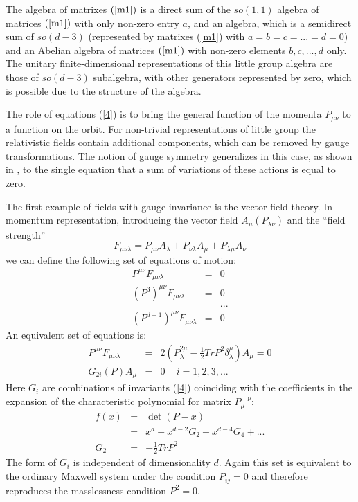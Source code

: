 \documentclass[a4paper,12pt]{article}
\begin{document}
The algebra of matrixes $(\ref{m1})$ is a direct sum of the
$so(1,1)$ algebra of matrices $(\ref{m1})$ with only non-zero
entry $a$, and an algebra, which is a semidirect sum of $so(d-3)$
(represented by matrixes (\ref {m1}) with $a=b=c=...=d=0$) and an
Abelian algebra of matrices $(\ref{m1})$ with non-zero elements
$b,c,...,d$ only. The unitary finite-dimensional representations
of this little group algebra are those of $so(d-3)$ subalgebra,
with other generators represented by zero, which is possible due
to the structure of the algebra.

The role of equations (\ref{4}) is to bring the general function
of the momenta $ P_{\mu \nu }$ to a function on the orbit. For
non-trivial representations of little group the relativistic
fields contain additional components, which can be removed by
gauge transformations. The notion of gauge symmetry generalizes in
this case, as shown in \cite{Man1}, to the single equation that a
sum of variations of these actions is equal to zero.

The first example of fields with gauge invariance is the vector
field theory. In momentum representation, introducing the vector
field $A_{\mu }(P_{\lambda \nu })$ and the ``field strength''
\begin{equation}
F_{\mu \nu \lambda }=P_{\mu \nu }A_{\lambda }+P_{\nu \lambda
}A_{\mu }+P_{\lambda \mu }A_{\nu }  \label{14}
\end{equation}
we can define the following set of equations of motion:
\begin{eqnarray}
P^{\mu \nu }F_{\mu \nu \lambda } &=&0  \label{15-0.1} \\
(P^{3})^{\mu \nu }F_{\mu \nu \lambda } &=&0  \label{15-0.2} \\
&&... \\
(P^{d-1})^{\mu \nu }F_{\mu \nu \lambda } &=&0  \label{15-0.4}
\end{eqnarray}
An equivalent set of equations is:
\begin{eqnarray}
P^{\mu \nu }F_{\mu \nu \lambda } &=&2\left( P_{\lambda }^{2\mu
}-\frac{1}{2}
TrP^{2}\delta _{\lambda }^{\mu }\right) A_{\mu }=0  \label{15.1} \\
G_{2i}(P)A_{\mu } &=&0\,\,\,\,\,\,\,i=1,2,3,...  \label{15.2}
\end{eqnarray}
Here $G_{i}$  are combinations of invariants (\ref{4}) coinciding
with the coefficients in the expansion of the characteristic
polynomial for matrix $P_{\mu }^{\quad \nu }$:
\begin{eqnarray}
f(x) &=&\det (P-x)  \label{15.3} \\
&=&x^{d}+x^{d-2}G_{2}+x^{d-4}G_{4}+...  \\
G_{2}&=&-\frac{1}{2}TrP^{2}
\end{eqnarray}
The form of  $G_{i}$ is independent of dimensionality $d$. Again
this set is equivalent to the ordinary Maxwell system under the
condition $P_{ij}=0$ and therefore reproduces the masslessness
condition $ P^{2}=0$.
\end{document}
